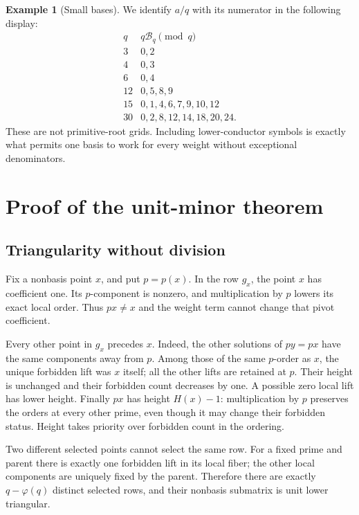 \documentclass[11pt]{article}
\numberwithin{equation}{section}
\theoremstyle{definition}
\newtheorem{example}[theorem]{Example}
\theoremstyle{remark}
\newcommand{\B}{\mathcal B}
\begin{document}
\begin{example}[Small bases]
We identify $a/q$ with its numerator in the following display:
\[
\begin{array}{c|l}
 q& q\B_q\pmod q\\\hline
 3&0,2\\
 4&0,3\\
 6&0,4\\
 12&0,5,8,9\\
 15&0,1,4,6,7,9,10,12\\
 30&0,2,8,12,14,18,20,24.
\end{array}
\]
These are not primitive-root grids. Including lower-conductor symbols is
exactly what permits one basis to work for every weight without
exceptional denominators.
\end{example}

\section{Proof of the unit-minor theorem}
\label{sec:unitproof}

\subsection{Triangularity without division}
Fix a nonbasis point $x$, and put $p=p(x)$. In the row $g_x$, the point
$x$ has coefficient one. Its $p$-component is nonzero, and multiplication
by $p$ lowers its exact local order. Thus $px\ne x$ and the weight term
cannot change that pivot coefficient.

Every other point in $g_x$ precedes $x$. Indeed, the other solutions of
$py=px$ have the same components away from $p$. Among those of the same
$p$-order as $x$, the unique forbidden lift was $x$ itself; all the other
lifts are retained at $p$. Their height is unchanged and their forbidden
count decreases by one. A possible zero local lift has lower height.
Finally $px$ has height $H(x)-1$: multiplication by $p$ preserves the
orders at every other prime, even though it may change their forbidden
status. Height takes priority over forbidden count in the ordering.

Two different selected points cannot select the same row. For a fixed
prime and parent there is exactly one forbidden lift in its local fiber;
the other local components are uniquely fixed by the parent. Therefore
there are exactly $q-\varphi(q)$ distinct selected rows, and their
nonbasis submatrix is unit lower triangular.
\end{document}
